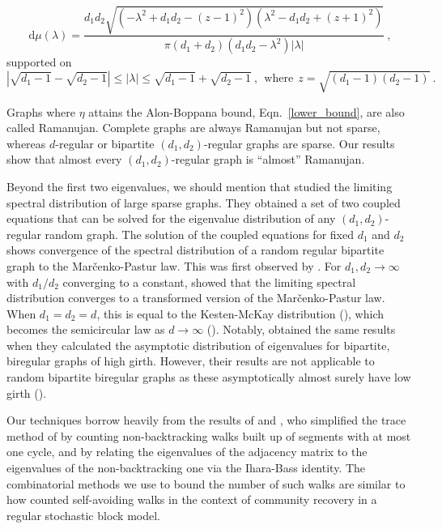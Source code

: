 \begin{equation}
    \mathrm{d}\mu(\lambda) = 
    \frac{d_1 d_2 \sqrt{(- \lambda^2 + d_1 d_2 - (z - 1)^2)
                (\lambda^2 - d_1 d_2 + (z + 1)^2)}}
            {\pi (d_1 + d_2) (d_1 d_2 - \lambda^2) |\lambda|}~, 
    \label{eq:bipartite_esd}
\end{equation}
supported on 
$$|\sqrt{d_1-1} - \sqrt{d_2 - 1}| \leq |\lambda| \leq \sqrt{d_1-1} + \sqrt{d_2 - 1}~,~~\mbox{
where} ~~z=\sqrt{(d_1 - 1)(d_2 - 1)}~.$$

Graphs where $\eta$ attains the
Alon-Boppana bound, Eqn.~\eqref{lower_bound}, are also called Ramanujan.
Complete graphs are always Ramanujan but not sparse, 
whereas $d$-regular or bipartite $(d_1, d_2)$-regular graphs are sparse. 
Our results show that  
almost every $(d_1, d_2)$-regular graph is ``almost'' Ramanujan.

Beyond the first two eigenvalues, 
we should mention that \citet*{bordenave2010}
studied the limiting spectral distribution
of large sparse graphs.
They obtained a set of two coupled equations
that can be solved for the eigenvalue distribution of any
$(d_1, d_2)$-regular random graph. 
The solution of the coupled equations for fixed $d_1$ and $d_2$ shows convergence of the spectral distribution of a random regular bipartite graph to the Mar\v{c}enko-Pastur law. 
This was first observed by \citet*{godsil1988}. 
For $d_1, d_2 \to \infty$ with
$d_1/d_2$ converging to a constant, \citet*{dumitriu2016} showed that the limiting spectral distribution converges to a transformed version of the Mar\v{c}enko-Pastur law. When $d_1 = d_2 = d$, this is equal to the
Kesten-McKay distribution (\citet*{mckay1981}),
which becomes the 
semicircular law as $d \to \infty$
(\citet*{godsil1988, dumitriu2016}). 
Notably, \citet*{mizuno2003} 
obtained the same results when they calculated the asymptotic
distribution of eigenvalues for bipartite, biregular graphs of high girth.
However, their results are not applicable to 
random bipartite biregular graphs as these 
asymptotically almost surely have low girth (\citet*{dumitriu2016}).

Our techniques borrow heavily from the results of \citet*{bordenave2015a}
and \citet*{bordenave2015},
who simplified the trace method of \citet*{friedman2003a}
by counting non-backtracking walks built up of segments with at most one cycle, and by relating the eigenvalues of the adjacency matrix to the eigenvalues of the non-backtracking one via the Ihara-Bass identity.
The combinatorial methods we use to bound the number of 
such walks are similar to how 
\citet*{brito2015} counted self-avoiding walks
in the context of community recovery in a regular stochastic block model.


